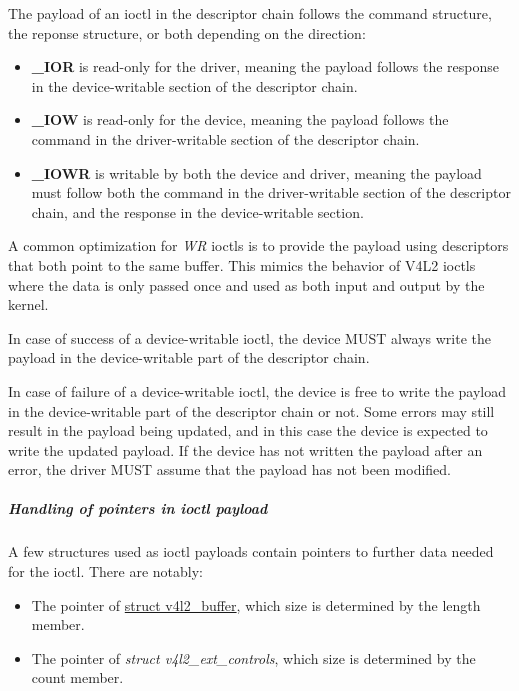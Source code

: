 The payload of an ioctl in the descriptor chain follows the command structure,
the reponse structure, or both depending on the direction:

\begin{itemize}
\item \textbf{_IOR} is read-only for the driver, meaning the payload
follows the response in the device-writable section of the descriptor chain.
\item \textbf{_IOW} is read-only for the device, meaning the payload
follows the command in the driver-writable section of the descriptor chain.
\item \textbf{_IOWR} is writable by both the device and driver,
meaning the payload must follow both the command in the driver-writable section
of the descriptor chain, and the response in the device-writable section.
\end{itemize}

A common optimization for \textit{WR} ioctls is to provide the payload using
descriptors that both point to the same buffer. This mimics the behavior of
V4L2 ioctls where the data is only passed once and used as both input and
output by the kernel.


In case of success of a device-writable ioctl, the device MUST always write the
payload in the device-writable part of the descriptor chain.

In case of failure of a device-writable ioctl, the device is free to write the
payload in the device-writable part of the descriptor chain or not. Some errors
may still result in the payload being updated, and in this case the device is
expected to write the updated payload. If the device has not written the
payload after an error, the driver MUST assume that the payload has not been
modified.

\subparagraph{Handling of pointers in ioctl payload}

A few structures used as ioctl payloads contain pointers to further
data needed for the ioctl. There are notably:

\begin{itemize}
\item The  pointer of
\href{https://www.kernel.org/doc/html/latest/userspace-api/media/v4l/buffer.html#struct-v4l2-buffer}{struct v4l2_buffer},
which size is determined by the length member.
\item The  pointer of \textit{struct v4l2_ext_controls}, which
size is determined by the count member.
\end{itemize}

